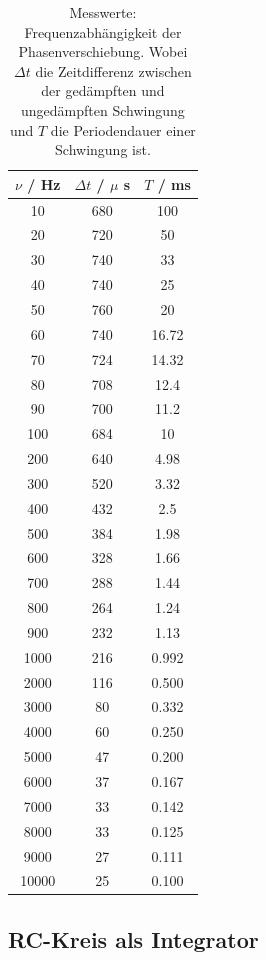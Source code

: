 \begin{table}
  \centering
  \caption{Messwerte: Frequenzabhängigkeit der Phasenverschiebung. Wobei $\Delta t$ die Zeitdifferenz
  zwischen der gedämpften und ungedämpften Schwingung und $T$ die Periodendauer einer Schwingung ist.}
  \label{table3}
  \begin{tabular}{c c c}
    \toprule
    $\nu$ / Hz & $\Delta t$ / $\mu$ s & $T$ / ms \\
    \midrule
    10 & 680 & 100\\
    20 & 720 & 50\\
    30 & 740 & 33\\
    40 & 740 & 25\\
    50 & 760 & 20\\
    60 & 740 & 16.72\\
    70 & 724 & 14.32\\
    80 & 708 & 12.4\\
    90 & 700 & 11.2\\
    100 & 684 & 10\\
    200 & 640 & 4.98\\
    300 & 520 & 3.32\\
    400 & 432 & 2.5\\
    500 & 384 & 1.98\\
    600 & 328 & 1.66\\
    700 & 288 & 1.44\\
    800 & 264 & 1.24\\
    900 & 232 & 1.13\\
    1000 & 216 & 0.992\\
    2000 & 116 & 0.500\\
    3000 & 80 & 0.332\\
    4000 & 60 & 0.250\\
    5000 & 47 & 0.200\\
    6000 & 37 & 0.167\\
    7000 & 33 & 0.142\\
    8000 & 33 & 0.125\\
    9000 & 27 & 0.111\\
    10000 & 25 & 0.100\\
    \bottomrule
  \end{tabular}
\end{table}

\newpage

\subsection{RC-Kreis als Integrator}

